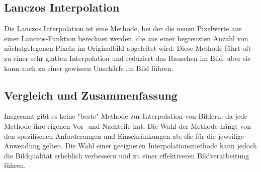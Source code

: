 \subsection{Lanczos Interpolation}

Die Lanczos Interpolation ist eine Methode, bei der die neuen Pixelwerte aus einer Lanczos-Funktion berechnet werden, die aus einer begrenzten Anzahl von nächstgelegenen Pixeln im Originalbild abgeleitet wird. 
Diese Methode führt oft zu einer sehr glatten Interpolation und reduziert das Rauschen im Bild, aber sie kann auch zu einer gewissen Unschärfe im Bild führen.

\subsection{Vergleich und Zusammenfassung}

Insgesamt gibt es keine "beste" Methode zur Interpolation von Bildern, da jede Methode ihre eigenen Vor- und Nachteile hat. 
Die Wahl der Methode hängt von den spezifischen Anforderungen und Einschränkungen ab, die für die jeweilige Anwendung gelten. 
Die Wahl einer geeigneten Interpolationsmethode kann jedoch die Bildqualität erheblich verbessern und zu einer effektiveren Bildverarbeitung führen.
\newpage
